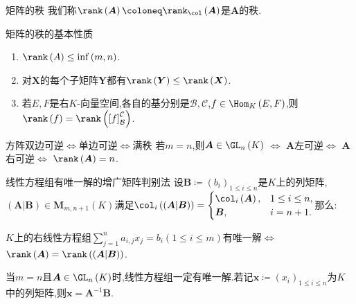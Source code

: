 \begin{definition}{矩阵的秩}{}
	我们称$\rank\left(\boldsymbol{A}\right)\coloneq\rank_{\col}\left(\boldsymbol{A}\right)$是$\boldsymbol{A}$的秩.
\end{definition}

\begin{proposition}{矩阵的秩的基本性质}{}
	\begin{enumerate}
		\item $\rank\left(A\right)\leq\inf\left(m,n\right)$.
		\item 对$\boldsymbol{X}$的每个子矩阵$\boldsymbol{Y}$都有$\rank\left(\boldsymbol{Y}\right)\leq\rank\left(\boldsymbol{X}\right)$.
		\item 若$E,F$是右$K$-向量空间,各自的基分别是$\mathcal{B},\mathcal{C}$,$f\in\Hom_{K}\left(E,F\right)$,则$\rank\left(f\right)=\rank\left(\left[f\right]_{\mathcal{B}}^{\mathcal{C}}\right)$.
	\end{enumerate}
\end{proposition}

\begin{proposition}{方阵双边可逆$\iff$单边可逆$\iff$满秩}{}
	若$m=n$,则$\boldsymbol{A}\in\GL_{n}\left(K\right)$ $\iff$ $\boldsymbol{A}$左可逆$\iff$ $\boldsymbol{A}$右可逆$\iff$ $\rank\left(\boldsymbol{A}\right)=n$.
\end{proposition}

\begin{proposition}{线性方程组有唯一解的增广矩阵判别法}{}
	设$\boldsymbol{B}\coloneq\left(b_{i}\right)_{1\leq i\leq n}$是$K$上的列矩阵,$\left(\boldsymbol{A}|\boldsymbol{B}\right)\in\mathbf{M}_{m,n+1}\left(K\right)$满足$\col_{i}\left(\left(\boldsymbol{A}|\boldsymbol{B}\right)\right)=
	\begin{cases}
		\col_{i}\left(\boldsymbol{A}\right),&1\leq i\leq n,\\
		\boldsymbol{B},&i=n+1.
	\end{cases}$那么:
	\begin{center}
		$K$上的右线性方程组$\sum\limits_{j=1}^{n}a_{i,j}x_{j}=b_{i}\left(1\leqslant i\leqslant m\right)$有唯一解$\iff$ $\rank\left(\boldsymbol{A}\right)=\rank\left(\left(\boldsymbol{A}|\boldsymbol{B}\right)\right)$.
	\end{center}
\end{proposition}

\begin{remark}{}{}
	当$m=n$且$\boldsymbol{A}\in\GL_{n}\left(K\right)$时,线性方程组一定有唯一解.若记$\boldsymbol{x}\coloneq\left(x_{i}\right)_{1\leq i\leq n}$为$K$中的列矩阵,则$\boldsymbol{x}=\boldsymbol{A}^{-1}\boldsymbol{B}$.
\end{remark}

